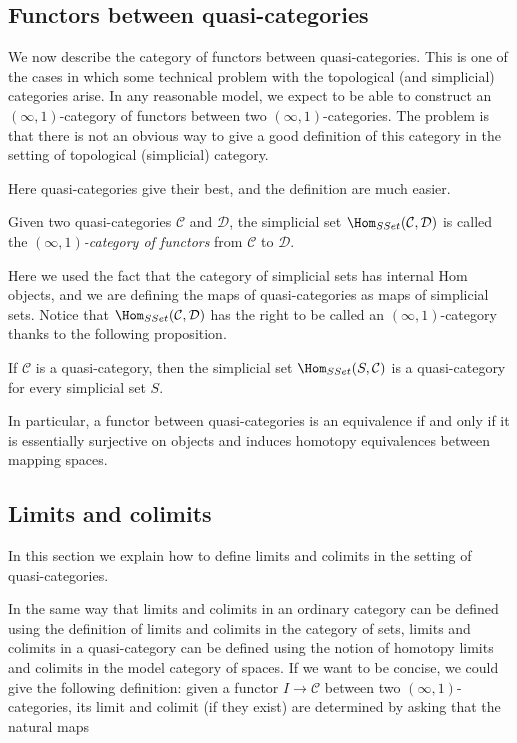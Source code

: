 \subsection{Functors between quasi-categories}

We now describe the category of functors between quasi-categories. This is one of the cases in which some technical problem with the topological (and simplicial) categories arise. In any reasonable model, we expect to be able to construct an $(\infty,1)$-category of functors between two $(\infty,1)$-categories. The problem is that there is not an obvious way to give a good definition of this category in the setting of topological (simplicial) category.

Here quasi-categories give their best, and the definition are much easier.

\begin{defin}
Given two quasi-categories $\mathcal C$ and $\mathcal D$, the simplicial set $\Hom_{SSet}(\mathcal C,\mathcal D)$ is called the \emph{$(\infty,1)$-category of functors} from $\mathcal C$ to $\mathcal D$.
\end{defin}

Here we used the fact that the category of simplicial sets has internal Hom objects, and we are defining the maps of quasi-categories as maps of simplicial sets. Notice that $\Hom_{SSet}(\mathcal C,\mathcal D)$ has the right to be called an $(\infty,1)$-category thanks to the following proposition.

\begin{prop}
If $\mathcal C$ is a quasi-category, then the simplicial set $\Hom_{SSet}(S,\mathcal C)$ is a quasi-category for every simplicial set $S$.
\end{prop}

In particular, a functor between quasi-categories is an equivalence if and only if it is essentially surjective on objects and induces homotopy equivalences between mapping spaces.


\subsection{Limits and colimits}

In this section we explain how to define limits and colimits in the setting of quasi-categories.

In the same way that limits and colimits in an ordinary category can be defined using the definition of limits and colimits in the category of sets, limits and colimits in a quasi-category can be defined using the notion of homotopy limits and colimits in the model category of spaces.
If we want to be concise, we could give the following definition: given a functor $I \to \mathcal C$ between two $(\infty,1)$-categories, its limit and colimit (if they exist) are determined by asking that the natural maps

